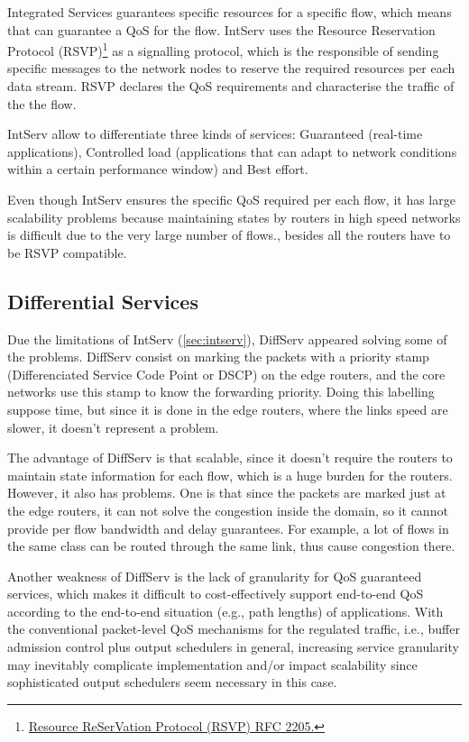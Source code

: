 Integrated Services guarantees specific resources for a specific flow, which means that can guarantee a QoS for the flow. IntServ uses the Resource Reservation Protocol (RSVP)\footnote{\href{http://tools.ietf.org/html/rfc2205}{Resource ReSerVation Protocol (RSVP) RFC 2205.}} as a signalling protocol, which is the responsible of sending specific messages to the network nodes to reserve the required resources per each data stream. RSVP declares the QoS requirements and characterise the traffic of the the flow. 

IntServ allow to differentiate three kinds of services: Guaranteed (real-time applications), Controlled load (applications that can adapt to network conditions within a certain performance window) and Best effort.



Even though IntServ ensures the specific QoS required per each flow, it has large scalability problems because maintaining states by routers in high speed networks is difficult due to the very large number of flows., besides all the routers have to be RSVP compatible.   

\subsection{Differential Services}
\label{sec:diffserv}

Due the limitations of IntServ (\ref{sec:intserv}), DiffServ appeared solving some of the problems. DiffServ consist on marking the packets with a priority stamp (Differenciated Service Code Point or DSCP) on the edge routers, and the core networks use this stamp to know the forwarding priority. Doing this labelling suppose time, but since it is done in the edge routers, where the links speed are slower, it doesn't represent a problem.

The advantage of DiffServ is that scalable, since it doesn't require the routers to maintain state information for each flow, which is a huge burden for the routers. However, it also has problems. One is that since the packets are marked just at the edge routers, it can not solve the congestion inside the domain, so it cannot provide per flow bandwidth and delay guarantees. For example, a lot of flows in the same class can be routed through the same link, thus cause congestion there.

Another weakness of DiffServ is the lack of granularity for QoS guaranteed services, which makes it difficult to cost-effectively support end-to-end QoS according to the end-to-end situation (e.g., path lengths) of applications. With the conventional packet-level QoS mechanisms for the regulated traffic, i.e., buffer admission control plus output schedulers in general, increasing service granularity may inevitably complicate implementation and/or impact scalability since sophisticated output schedulers seem necessary in this case.


